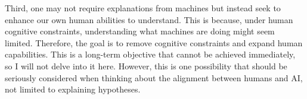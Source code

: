 Third, one may not require explanations from machines but instead seek to enhance our own human abilities to understand. This is because, under human cognitive constraints, understanding what machines are doing might seem limited. Therefore, the goal is to remove cognitive constraints and expand human capabilities. This is a long-term objective that cannot be achieved immediately, so I will not delve into it here. However, this is one possibility that should be seriously considered when thinking about the alignment between humans and AI, not limited to explaining hypotheses.




